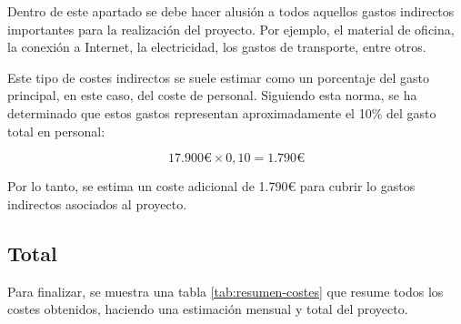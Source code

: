 Dentro de este apartado se debe hacer alusión a todos aquellos gastos indirectos importantes para la realización del proyecto. Por ejemplo, el material de oficina, la conexión a Internet, la electricidad, los gastos de transporte, entre otros.

Este tipo de costes indirectos se suele estimar como un porcentaje del gasto principal, en este caso, del coste de personal. Siguiendo esta norma, se ha determinado que estos gastos representan aproximadamente el 10\% del gasto total en personal:

\begin{equation}
17.900€ \times 0,10 = 1.790€
\end{equation}

Por lo tanto, se estima un coste adicional de 1.790€ para cubrir lo gastos indirectos asociados al proyecto.

\subsection{Total}

Para finalizar, se muestra una tabla \ref{tab:resumen-costes} que resume todos los costes obtenidos, haciendo una estimación mensual y total del proyecto.
\begin{table}[H]
    \centering
    \caption{Total de costes del proyecto}
    \label{tab:resumen-costes}
\end{table}
